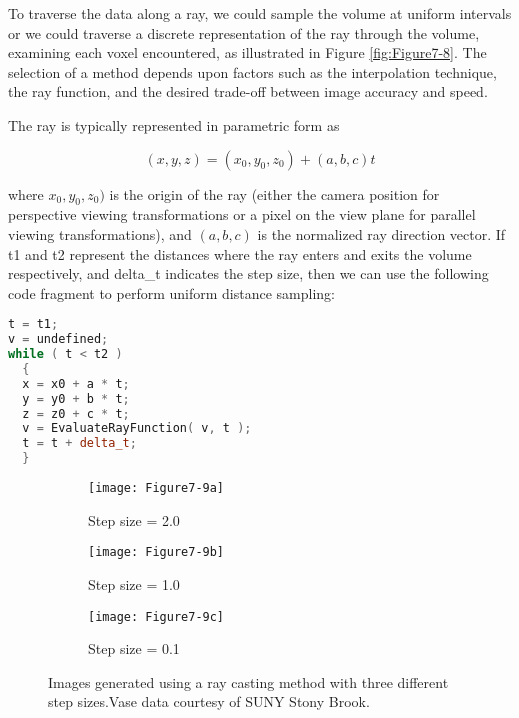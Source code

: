 To traverse the data along a ray, we could sample the volume at uniform intervals or we could traverse a discrete representation of the ray through the volume, examining each voxel encountered, as illustrated in Figure \ref{fig:Figure7-8}. The selection of a method depends upon factors such as the interpolation technique, the ray function, and the desired trade-off between image accuracy and speed.

The ray is typically represented in parametric form as

\begin{equation}\label{eq:7.2}
\left(x, y, z\right) = \left(x_0, y_0, z_0\right) + \left(a, b, c\right) t
\end{equation}

where $x_0,y_0,z_0)$ is the origin of the ray (either the camera position for
perspective viewing transformations or a pixel on the view plane for parallel viewing transformations), and $(a, b, c)$ is the normalized ray direction vector. If t1 and t2 represent the distances where the ray enters and exits the volume respectively, and delta\_t indicates the step size, then we can use the following code fragment to perform uniform distance sampling:

\begin{lstlisting}[language=C++, caption={Uniform distance sampling.}]
t = t1;
v = undefined;
while ( t < t2 )
  {
  x = x0 + a * t;
  y = y0 + b * t;
  z = z0 + c * t;
  v = EvaluateRayFunction( v, t );
  t = t + delta_t;
  }
\end{lstlisting}

\begin{figure}[!htb]
	\begin{subfigure}[h]{0.32\linewidth}
		\texttt{[image: Figure7-9a]}
		\caption*{Step size = 2.0}\label{fig:Figure7-9a}
	\end{subfigure}
	\hfill
	\begin{subfigure}[h]{0.32\linewidth}
		\texttt{[image: Figure7-9b]}
		\caption*{Step size = 1.0}\label{fig:Figure7-9b}
	\end{subfigure}%
	\hfill
	\begin{subfigure}[h]{0.32\linewidth}
		\texttt{[image: Figure7-9c]}
		\caption*{Step size = 0.1}\label{fig:Figure7-9c}
	\end{subfigure}%
	\caption{Images generated using a ray casting method with three different step sizes.Vase data courtesy of SUNY Stony Brook.}\label{fig:Figure7-9}
\end{figure}

